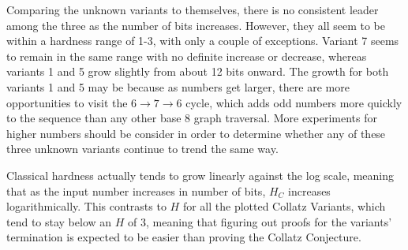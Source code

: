 Comparing the unknown variants to themselves, there is no consistent leader among the three as the number of bits increases. However, they all seem to be within a hardness range of 1-3, with only a couple of exceptions. Variant 7 seems to remain in the same range with no definite increase or decrease, whereas variants 1 and 5 grow slightly from about 12 bits onward. The growth for both variants 1 and 5 may be because as numbers get larger, there are more opportunities to visit the $6 \rightarrow 7 \rightarrow 6$ cycle, which adds odd numbers more quickly to the sequence than any other base 8 graph traversal. More experiments for higher numbers should be consider in order to determine whether any of these three unknown variants continue to trend the same way.\par
Classical hardness actually tends to grow linearly against the log scale, meaning that as the input number increases in number of bits, $H_C$ increases logarithmically. This contrasts to $H$ for all the plotted Collatz Variants, which tend to stay below an $H$ of 3, meaning that figuring out proofs for the variants' termination is expected to be easier than proving the Collatz Conjecture.
